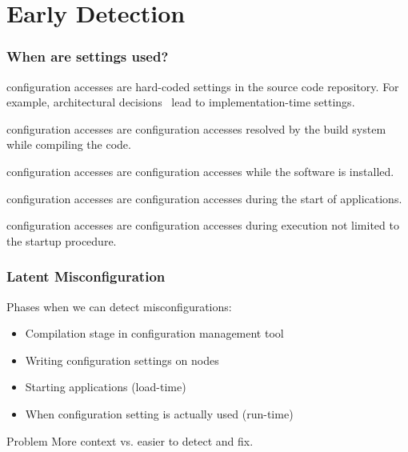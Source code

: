 \section{Early Detection}

\begin{frame}
	\frametitle{When are settings used?}
	\begin{description}[labelsep=1cm,align=left]
	\item[Implementation-time] configuration accesses 
	are hard-coded settings in the sou\-rce code repository.
	For example, architectural decisions~\cite{zdun2007patterns} lead to impl\-ementation-time settings.

	\item[Compile-time] configuration accesses 
	are configuration accesses resolved by the build system while compiling the code.

	\item[Deployment-time] configuration accesses 
	are configuration accesses while the software is installed.

	\item[Load-time] configuration accesses 
	are configuration accesses during the start of applications.

	\item[Run-time] configuration accesses 
	are configuration accesses during execution not limited to the startup procedure.
	\end{description}
\end{frame}

\begin{frame}
	\frametitle{Latent Misconfiguration}
	Phases when we can detect misconfigurations:
	\begin{itemize}
	\item Compilation stage in configuration management tool
	\item Writing configuration settings on nodes
	\item Starting applications (load-time)
	\item When configuration setting is actually used (run-time)
	\end{itemize}

	\begin{alertblock}{Problem}
	More context vs. easier to detect and fix.
	\end{alertblock}
\end{frame}


